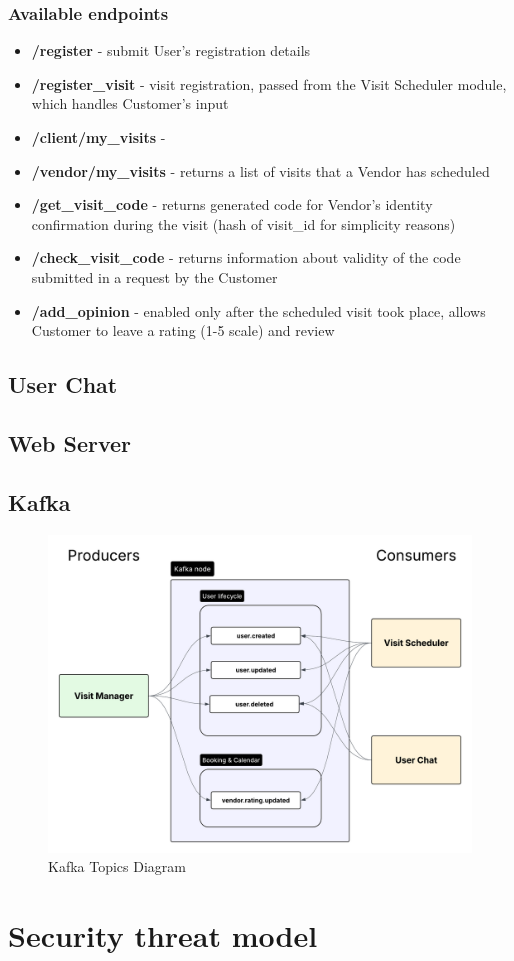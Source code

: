 \documentclass[11pt,a4paper]{article}
\begin{document}
\subsubsection{Available endpoints}
\begin{itemize}
\item \textbf{\slash register} - submit User's registration details
\item \textbf{\slash register\_visit} - visit registration, passed from the Visit Scheduler module, which handles Customer's input
\item \textbf{\slash client/my\_visits} - 
\item \textbf{\slash vendor/my\_visits} - returns a list of visits that a Vendor has scheduled
\item \textbf{\slash get\_visit\_code} - returns generated code for Vendor's identity confirmation during the visit (hash of visit\_id for simplicity reasons)
\item \textbf{\slash check\_visit\_code} - returns information about validity of the code submitted in a request by the Customer
\item \textbf{\slash add\_opinion} - enabled only after the scheduled visit took place, allows Customer to leave a rating (1-5 scale) and review
\end{itemize}


\subsection{User Chat}

\subsection{Web Server}

\subsection{Kafka}

\begin{figure}[H]
  \centering
  \includegraphics[width=\textwidth]{H4H_Kafka.png}
  \caption{Kafka Topics Diagram}
  \label{fig:kafka-topics-diagram}
\end{figure}

\section{Security threat model}
\end{document}
